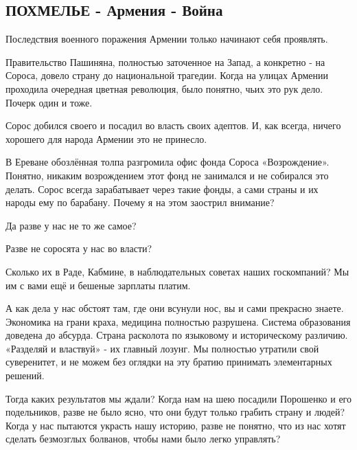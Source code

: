  
 
 

\subsection{ПОХМЕЛЬЕ - Армения - Война}
\label{sec:11_11_2020.fb.alex_belyy.1.armenia_pohmelie}


Последствия военного поражения Армении только начинают себя проявлять.

Правительство Пашиняна, полностью заточенное на Запад, а конкретно - на Сороса,
довело страну до национальной трагедии. Когда на улицах Армении проходила
очередная цветная революция, было понятно, чьих это рук дело. Почерк один и
тоже.

Сорос добился своего и посадил во власть своих адептов. И, как всегда, ничего
хорошего для народа Армении это не принесло. 

В Ереване обозлённая толпа разгромила офис фонда Сороса «Возрождение». Понятно,
никаким возрождением этот фонд не занимался и не собирался это делать. Сорос
всегда зарабатывает через такие фонды, а сами страны и их народы ему по
барабану. Почему я на этом заострил внимание? 

Да разве у нас не то же самое? 

Разве не соросята у нас во власти? 

Сколько их в Раде, Кабмине, в наблюдательных советах наших госкомпаний? Мы им с
вами ещё и бешеные зарплаты платим. 

А как дела у нас обстоят там,  где они всунули нос, вы и сами прекрасно знаете.
Экономика на грани краха, медицина полностью разрушена. Система образования
доведена до абсурда. Страна расколота по языковому и историческому различию.
«Разделяй и властвуй» - их главный лозунг. Мы полностью утратили свой
суверенитет, и не можем без оглядки на эту братию принимать элементарных
решений. 

Тогда каких результатов мы ждали? Когда нам на шею посадили Порошенко и его
подельников, разве не было ясно, что они будут только грабить страну и людей?
Когда у нас пытаются украсть нашу историю, разве не понятно, что из нас хотят
сделать безмозглых болванов, чтобы нами было легко управлять? 

